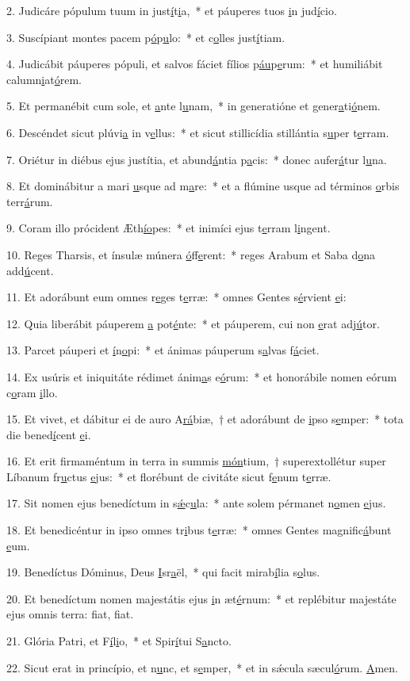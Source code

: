 2. Judicáre pópulum tuum in just\uline{í}t\uline{i}a,~* et páuperes tuos \uline{i}n jud\uline{í}cio.\par 
3. Suscípiant montes pacem p\uline{ó}p\uline{u}lo:~* et c\uline{o}lles just\uline{í}tiam.\par 
4. Judicábit páuperes pópuli, et salvos fáciet fílios p\uline{áu}p\uline{e}rum:~* et humiliábit calumn\uline{i}at\uline{ó}rem.\par 
5. Et permanébit cum sole, et \uline{a}nte l\uline{u}nam,~* in generatióne et gener\uline{a}ti\uline{ó}nem.\par 
6. Descéndet sicut plúvi\uline{a} in v\uline{e}llus:~* et sicut stillicídia stillántia s\uline{u}per t\uline{e}rram.\par 
7. Oriétur in diébus ejus justítia, et abund\uline{á}ntia p\uline{a}cis:~* donec aufer\uline{á}tur l\uline{u}na.\par 
8. Et dominábitur a mari \uline{u}sque ad m\uline{a}re:~* et a flúmine usque ad términos \uline{o}rbis terr\uline{á}rum.\par 
9. Coram illo prócident Æth\uline{í}\uline{o}pes:~* et inimíci ejus t\uline{e}rram l\uline{i}ngent.\par 
10. Reges Tharsis, et ínsulæ múnera \uline{ó}ff\uline{e}rent:~* reges Arabum et Saba d\uline{o}na add\uline{ú}cent.\par 
11. Et adorábunt eum omnes r\uline{e}ges t\uline{e}rræ:~* omnes Gentes s\uline{é}rvient \uline{e}i:\par 
12. Quia liberábit páuperem \uline{a} pot\uline{é}nte:~* et páuperem, cui non \uline{e}rat adj\uline{ú}tor.\par 
13. Parcet páuperi et \uline{í}n\uline{o}pi:~* et ánimas páuperum s\uline{a}lvas f\uline{á}ciet.\par 
14. Ex usúris et iniquitáte rédimet ánim\uline{a}s e\uline{ó}rum:~* et honorábile nomen eórum c\uline{o}ram \uline{i}llo.\par 
15. Et vivet, et dábitur ei de auro A\uline{rá}biæ,~† et adorábunt de \uline{i}pso s\uline{e}mper:~* tota die bened\uline{í}cent \uline{e}i.\par 
16. Et erit firmaméntum in terra in summis \uline{món}tium,~† superextollétur super Líbanum fr\uline{u}ctus \uline{e}jus:~* et florébunt de civitáte sicut f\uline{e}num t\uline{e}rræ.\par 
17. Sit nomen ejus benedíctum in s\uline{ǽ}c\uline{u}la:~* ante solem pérmanet n\uline{o}men \uline{e}jus.\par 
18. Et benedicéntur in ipso omnes tr\uline{i}bus t\uline{e}rræ:~* omnes Gentes magnific\uline{á}bunt \uline{e}um.\par 
19. Benedíctus Dóminus, Deus \uline{I}sr\uline{a}ël,~* qui facit mirab\uline{í}lia s\uline{o}lus.\par 
20. Et benedíctum nomen majestátis ejus \uline{i}n æt\uline{é}rnum:~* et replébitur majestáte ejus omnis terra: f\uline{i}at, f\uline{i}at.\par 
21. Glória Patri, et F\uline{í}l\uline{i}o,~* et Spir\uline{í}tui S\uline{a}ncto.\par 
22. Sicut erat in princípio, et n\uline{u}nc, et s\uline{e}mper,~* et in sǽcula sæcul\uline{ó}rum. \uline{A}men.\par 
